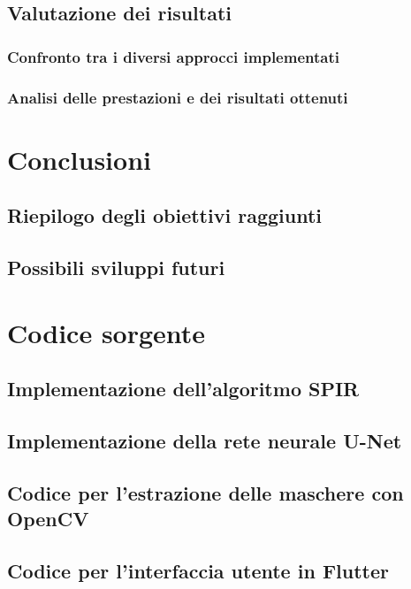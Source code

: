 \documentclass[a4paper,12pt]{report}
\begin{document}
\section{Valutazione dei risultati}
\subsection{Confronto tra i diversi approcci implementati}
\subsection{Analisi delle prestazioni e dei risultati ottenuti}

\chapter{Conclusioni}
\section{Riepilogo degli obiettivi raggiunti}
\section{Possibili sviluppi futuri}

\chapter{Codice sorgente}
\section{Implementazione dell'algoritmo SPIR}
\section{Implementazione della rete neurale U-Net}
\section{Codice per l'estrazione delle maschere con OpenCV}
\section{Codice per l'interfaccia utente in Flutter}
\end{document}
